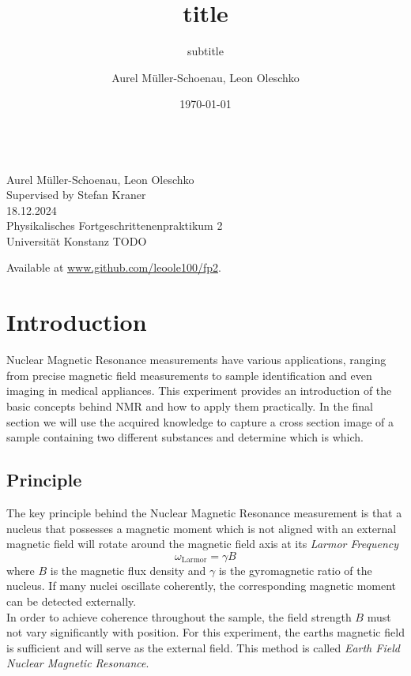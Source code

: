 \documentclass[
    parskip=half, 
    twoside=false,
    twocolumn=true,
    fontsize=11pt,
]{scrarticle}
\begin{document}
\title{title}
\subtitle{subtitle}
\author{Aurel Müller-Schoenau, Leon Oleschko}
\date{\dotdate\today}


\begin{titlepage}
    \sffamily
    \vspace*{3cm}
    {
        \fontsize{32}{32}
    }
    \vspace{.25cm}\\
    {
        \Large
        Aurel Müller-Schoenau, Leon Oleschko\\
        Supervised by Stefan Kraner
        \vspace{.05cm}\\
        18.12.2024
        \vspace{.25cm}\\
        \normalsize
        Physikalisches Fortgeschrittenenpraktikum 2\\
        Universität Konstanz
    }
    \vfill
    {
        \normalfont\normalsize 
        TODO
    }
    \vfill
    \begin{flushright}
        Available at \url{www.github.com/leoole100/fp2}.
    \end{flushright}
\end{titlepage}

\section{Introduction}
Nuclear Magnetic Resonance measurements have various applications, ranging from precise magnetic field measurements to sample identification and even imaging in medical appliances. This experiment provides an introduction of the basic concepts behind NMR and how to apply them practically. In the final section we will use the acquired knowledge to capture a cross section image of a sample containing two different substances and determine which is which.

\subsection*{Principle}
The key principle behind the Nuclear Magnetic Resonance measurement is that a nucleus that possesses a magnetic moment which is not aligned with an external magnetic field will rotate around the magnetic field axis at its \textit{Larmor Frequency}
\begin{equation}
\label{eq:larmor_frequency}
 \omega_\text{Larmor} = \gamma B
\end{equation}
where $B$ is the magnetic flux density and $\gamma$ is the gyromagnetic ratio of the nucleus. If many nuclei oscillate coherently, the corresponding magnetic moment can be detected externally.\\
In order to achieve coherence throughout the sample, the field strength $B$ must not vary significantly with position. For this experiment, the earths magnetic field is sufficient and will serve as the external field. This method is called \textit{Earth Field Nuclear Magnetic Resonance}.
\end{document}
